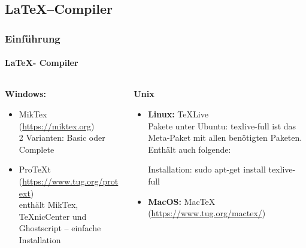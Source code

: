 
\subsection{\LaTeX --Compiler}
\begin{frame}
\frametitle{Einf\"uhrung}
\framesubtitle{\LaTeX - Compiler}
\begin{columns}[t]
\begin{column}{.4\textwidth}
\textbf{Windows:}\\
\begin{itemize}
  \item MikTex (\url{https://miktex.org})\\
   2 Varianten: Basic oder Complete
  \item ProTeXt (\url{https://www.tug.org/protext})\\ 
   enthält MikTex, TeXnicCenter und Ghostscript – einfache Installation\\
\end{itemize}
\end{column}
\begin{column}{.6\textwidth}
\textbf{Unix}
\begin{itemize}
  \item \textbf{Linux:} TeXLive\\
Pakete unter Ubuntu: {\ttfamily texlive-full} ist das Meta-Paket mit allen
ben\"otigten Paketen. Enthält auch folgende:
Installation: {\ttfamily sudo apt-get install texlive-full}
\item \textbf{MacOS:} MacTeX (\url{https://www.tug.org/mactex/})\\
\end{itemize}
\end{column}
\end{columns}
\end{frame}


